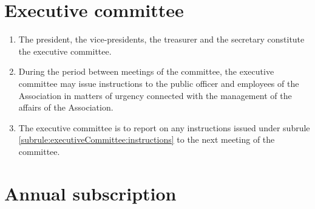 \documentclass[a4paper,11pt]{article}
\begin{document}
\section{Executive committee}
\label{rule:executiveCommittee}

\begin{enumerate}
	\item The president, the vice-presidents, the treasurer and the secretary constitute the executive committee.
	\item \label{subrule:executiveCommittee:instructions} During the period between meetings of the committee, the executive committee may issue instructions to the public officer and employees of the Association in matters of urgency connected with the management of the affairs of the Association.
	\item The executive committee is to report on any instructions issued under subrule \ref{subrule:executiveCommittee:instructions} to the next meeting of the committee.
\end{enumerate}

\section{Annual subscription}
\label{rule:subscription}
\end{document}
